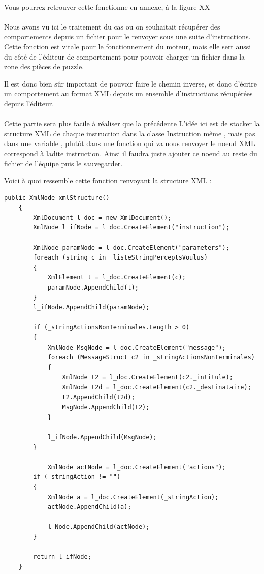 \documentclass{report}
\begin{document}
\paragraph{}
Vous pourrez retrouver cette fonctionne en annexe, à la figure XX
\paragraph{}
Nous avons vu ici le traitement du cas ou on souhaitait récupérer des comportements depuis un fichier pour le renvoyer sous une suite d’instructions. Cette fonction est vitale pour le fonctionnement du moteur, mais elle sert aussi du côté de l’éditeur de comportement pour pouvoir charger un fichier dans la zone des pièces de puzzle.

Il est donc bien sûr important de pouvoir faire le chemin inverse, et donc d’écrire un comportement au format XML depuis un ensemble d’instructions récupérées depuis l’éditeur.

\paragraph{}

Cette partie sera plus facile à réaliser que la précédente 
L’idée ici est de stocker la structure XML de chaque instruction dans la classe Instruction même , mais pas dans une variable , plutôt dans une fonction qui va nous renvoyer le noeud XML correspond à ladite instruction. Ainsi il faudra juste ajouter ce noeud au reste du fichier de l’équipe puis le sauvegarder.

Voici à quoi ressemble cette fonction renvoyant la structure XML :
\begin{lstlisting}[frame=single]
 public XmlNode xmlStructure()
    {
        XmlDocument l_doc = new XmlDocument();
        XmlNode l_ifNode = l_doc.CreateElement("instruction");

        XmlNode paramNode = l_doc.CreateElement("parameters");
        foreach (string c in _listeStringPerceptsVoulus)
        {
            XmlElement t = l_doc.CreateElement(c);
            paramNode.AppendChild(t);
        }
        l_ifNode.AppendChild(paramNode);

        if (_stringActionsNonTerminales.Length > 0)
        {
            XmlNode MsgNode = l_doc.CreateElement("message");
            foreach (MessageStruct c2 in _stringActionsNonTerminales)
            {
                XmlNode t2 = l_doc.CreateElement(c2._intitule);
                XmlNode t2d = l_doc.CreateElement(c2._destinataire);
                t2.AppendChild(t2d);
                MsgNode.AppendChild(t2);
            }

            l_ifNode.AppendChild(MsgNode);
        }

            XmlNode actNode = l_doc.CreateElement("actions");
        if (_stringAction != "")
        {
            XmlNode a = l_doc.CreateElement(_stringAction);
            actNode.AppendChild(a);

            l_Node.AppendChild(actNode);
        }

        return l_ifNode;
    }
\end{lstlisting}
\end{document}
